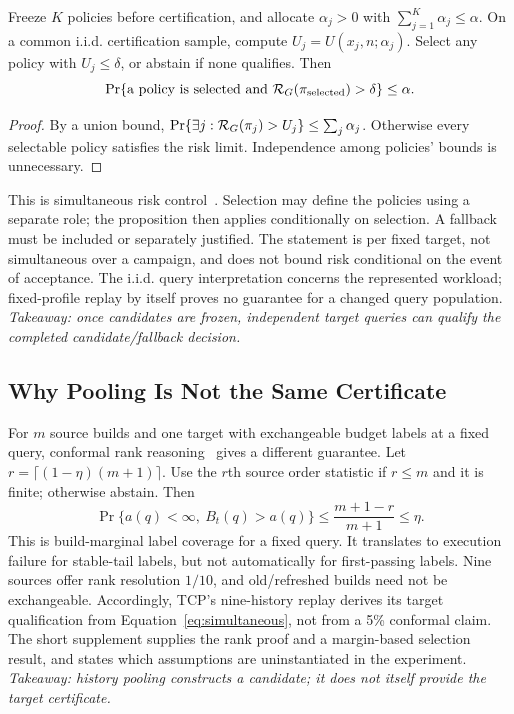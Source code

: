 \begin{proposition}
\label{prop:simultaneous}
Freeze $K$ policies before certification, and allocate $\alpha_j>0$ with $\sum_{j=1}^K\alpha_j\le\alpha$. On a common i.i.d. certification sample, compute $U_j=U(x_j,n;\alpha_j)$. Select any policy with $U_j\le\delta$, or abstain if none qualifies. Then
\begin{equation}
 \Pr\{\text{a policy is selected and }\mathcal{R}_G(\pi_{\rm selected})>\delta\}\le\alpha.\label{eq:simultaneous}
\end{equation}
\end{proposition}
\begin{proof}
By a union bound, $\Pr\{\exists j:\mathcal{R}_G(\pi_j)>U_j\}\le\sum_j\alpha_j$. Otherwise every selectable policy satisfies the risk limit. Independence among policies' bounds is unnecessary.
\end{proof}
This is simultaneous risk control~\cite{angelopoulos2021ltt}. Selection may define the policies using a separate role; the proposition then applies conditionally on selection. A fallback must be included or separately justified. The statement is per fixed target, not simultaneous over a campaign, and does not bound risk conditional on the event of acceptance. The i.i.d. query interpretation concerns the represented workload; fixed-profile replay by itself proves no guarantee for a changed query population. \emph{Takeaway: once candidates are frozen, independent target queries can qualify the completed candidate/fallback decision.}

\subsection{Why Pooling Is Not the Same Certificate}
\label{sec:pooling-theory}
For $m$ source builds and one target with exchangeable budget labels at a fixed query, conformal rank reasoning~\cite{angelopoulos2023conformal} gives a different guarantee. Let $r=\lceil(1-\eta)(m+1)\rceil$. Use the $r$th source order statistic if $r\le m$ and it is finite; otherwise abstain. Then
\begin{equation}
 \Pr\{a(q)<\infty,\ B_t(q)>a(q)\}\le\frac{m+1-r}{m+1}\le\eta.\label{eq:pooling}
\end{equation}
This is build-marginal label coverage for a fixed query. It translates to execution failure for stable-tail labels, but not automatically for first-passing labels. Nine sources offer rank resolution $1/10$, and old/refreshed builds need not be exchangeable. Accordingly, TCP's nine-history replay derives its target qualification from Equation~\eqref{eq:simultaneous}, not from a 5\% conformal claim. The short supplement supplies the rank proof and a margin-based selection result, and states which assumptions are uninstantiated in the experiment. \emph{Takeaway: history pooling constructs a candidate; it does not itself provide the target certificate.}
